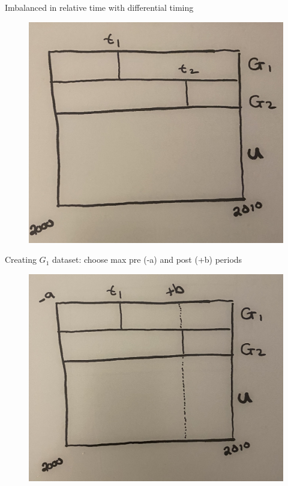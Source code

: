 \documentclass{beamer}
\begin{document}
\begin{frame}{Imbalanced in relative time with differential timing}

	\begin{figure}
	\includegraphics[scale=0.1]{./lecture_includes/stacked1.jpg}
	\end{figure}

\end{frame}


\begin{frame}{Creating $G_1$ dataset: choose max pre (-a) and post (+b) periods}

	\begin{figure}
	\includegraphics[scale=0.1]{./lecture_includes/stacked2.jpg}
	\end{figure}

\end{frame}
\end{document}
